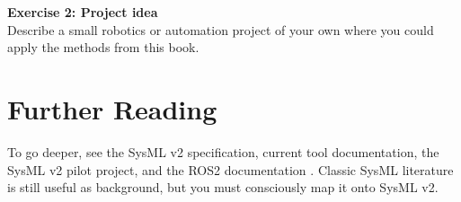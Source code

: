 \begin{uebungbox}
\textbf{Exercise 2: Project idea}\\
Describe a small robotics or automation project of your own where you could apply the methods from this book.
\end{uebungbox}

\section{Further Reading}
To go deeper, see the SysML v2 specification, current tool documentation, the SysML v2 pilot project, and the ROS2 documentation \cite{sysmlv2spec,sysmlv2pilot,ros2docs}. Classic SysML literature \cite{delligatti2014,friedenthal2014} is still useful as background, but you must consciously map it onto SysML v2.
